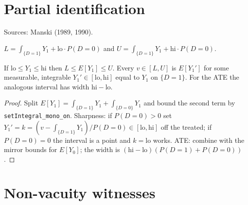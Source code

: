 \section{Partial identification}
\label{sec:manski}

Sources: Manski (1989, 1990).

\begin{definition}
\label{def:manski}
\leanok
{}
$L = \int_{\{D=1\}}Y_1 + \mathrm{lo}\cdot P(D=0)$ and $U = \int_{\{D=1\}}Y_1 + \mathrm{hi}\cdot P(D=0)$.
\end{definition}

\begin{theorem}
\label{thm:manski}
\leanok
{}
If $\mathrm{lo}\le Y_1\le\mathrm{hi}$ then $L \le E[Y_1]\le U$. Every $v\in[L,U]$ is $E[Y_1']$ for some measurable,
integrable $Y_1'\in[\mathrm{lo},\mathrm{hi}]$ equal to $Y_1$ on $\{D=1\}$. For the ATE the analogous interval has width
$\mathrm{hi}-\mathrm{lo}$.
\end{theorem}
\begin{proof}
\leanok
Split $E[Y_1] = \int_{\{D=1\}}Y_1 + \int_{\{D=0\}}Y_1$ and bound the second term by \texttt{setIntegral\_mono\_on}.
Sharpness: if $P(D=0) > 0$ set $Y_1' = k = (v - \int_{\{D=1\}}Y_1)/P(D=0)\in[\mathrm{lo},\mathrm{hi}]$ off the treated;
if $P(D=0) = 0$ the interval is a point and $k = \mathrm{lo}$ works. ATE: combine with the mirror bounds for $E[Y_0]$;
the width is $(\mathrm{hi} - \mathrm{lo})(P(D=1) + P(D=0))$.
\end{proof}

\section{Non-vacuity witnesses}
\label{sec:causal-witnesses}

